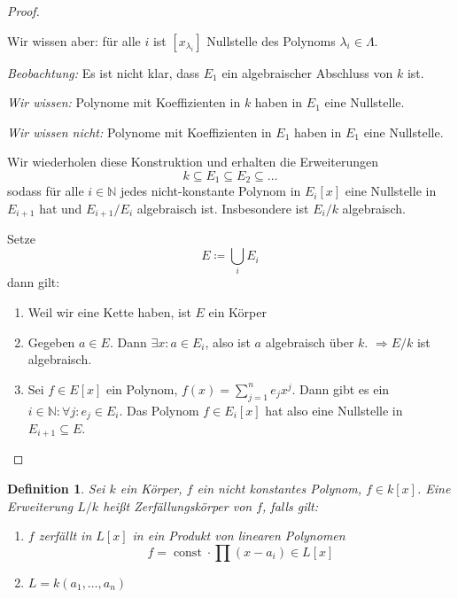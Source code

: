 \documentclass[a4paper,12pt,numbers=noenddot,parskip=full]{scrartcl}
\newcommand{\setN}{\mathbb{N}}
\theoremstyle{dotless}
\newtheorem{definition}[theorem]{Definition}
\theoremstyle{remark}
\begin{document}
\begin{proof}
\begin{enumerate}
			Wir wissen aber: für alle $i$ ist $[x_{\lambda_i}]$ Nullstelle des Polynoms $\lambda_i \in \Lambda$.
		\end{enumerate}
	
		\textit{Beobachtung:} Es ist nicht klar, dass $E_1$ ein algebraischer Abschluss von $k$ ist.
		
		\textit{Wir wissen:} Polynome mit Koeffizienten in $k$ haben in $E_1$ eine Nullstelle.
		
		\textit{Wir wissen nicht:} Polynome mit Koeffizienten in $E_1$ haben in $E_1$ eine Nullstelle.
		
		Wir wiederholen diese Konstruktion und erhalten die Erweiterungen
		\begin{equation*}
			k \subseteq E_1 \subseteq E_2 \subseteq \dots
		\end{equation*}
		sodass für alle $i \in \setN$ jedes nicht-konstante Polynom in $E_i[x]$ eine Nullstelle in $E_{i+1}$ hat und $E_{i+1} / E_i$ algebraisch ist. Insbesondere ist $E_i / k$ algebraisch.
		
		Setze
		\begin{equation*}
			E \coloneqq \bigcup_i E_i
		\end{equation*}
		dann gilt:
		\begin{enumerate}
			\item Weil wir eine Kette haben, ist $E$ ein Körper
			\item Gegeben $a \in E$. Dann $\exists x: a \in E_i$, also ist $a$ algebraisch über $k$. $\Rightarrow E/k$ ist algebraisch.
			\item Sei $f \in E[x]$ ein Polynom, $f(x) = \sum_{j=1}^n e_j x^j$. Dann gibt es ein $i \in \setN: \forall j: e_j \in E_i$. Das Polynom $f \in E_i[x]$ hat also eine Nullstelle in $E_{i+1} \subseteq E$.
		\end{enumerate}
	\end{proof}

	\begin{definition}
		Sei $k$ ein Körper, $f$ ein nicht konstantes Polynom, $f \in k[x]$. Eine Erweiterung $L/k$ heißt Zerfällungskörper von $f$, falls gilt:
		\begin{enumerate}
			\item $f$ zerfällt in $L[x]$ in ein Produkt von linearen Polynomen
			\begin{equation*}
				f = \operatorname{const} \cdot \prod (x - a_i) \in L[x]
			\end{equation*}
			\item $L = k(a_1, \dots, a_n)$
		\end{enumerate}
	\end{definition}
\end{document}
